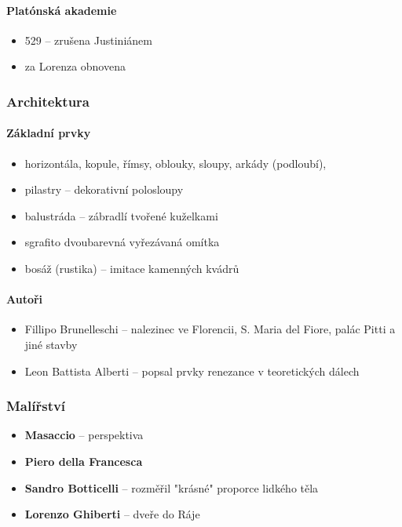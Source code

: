 \paragraph{Platónská akademie}
\begin{itemize}
\item 529 -- zrušena Justiniánem
\item za Lorenza obnovena
\end{itemize}

\subsubsection{Architektura}
\paragraph{Základní prvky}
\begin{itemize}
	\item horizontála, kopule, římsy, oblouky, sloupy, arkády (podloubí),  
	\item pilastry -- dekorativní polosloupy
	\item balustráda -- zábradlí tvořené kuželkami
	\item sgrafito dvoubarevná vyřezávaná omítka
	\item bosáž (rustika) -- imitace kamenných kvádrů
\end{itemize}
\paragraph{Autoři}
\begin{itemize}
\item Fillipo Brunelleschi -- nalezinec ve Florencii, S. Maria del Fiore, palác Pitti a jiné stavby
\item Leon Battista Alberti -- popsal prvky renezance v teoretických dálech
\end{itemize}

\subsubsection{Malířství}
\begin{itemize}
\item \textbf{Masaccio} -- perspektiva
\item \textbf{Piero della Francesca}
\item \textbf{Sandro Botticelli} -- rozměřil "krásné" proporce lidkého těla
\item \textbf{Lorenzo Ghiberti} -- dveře do Ráje
\end{itemize}


